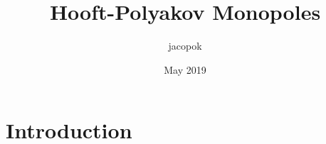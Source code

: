 \documentclass{article}
\title{Hooft-Polyakov Monopoles}
\author{jacopok }
\date{May 2019}
\begin{document}
\maketitle

\section{Introduction}
\end{document}
